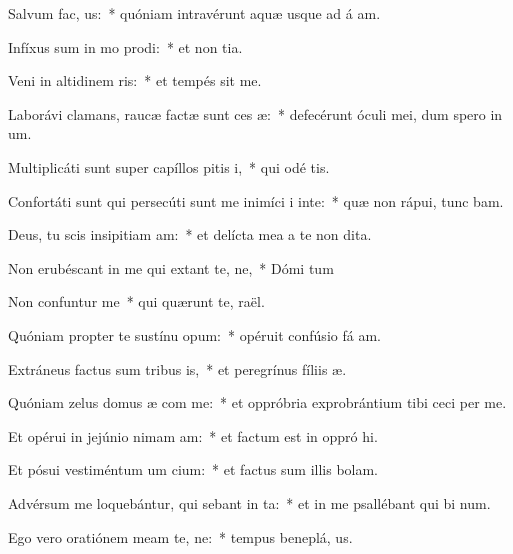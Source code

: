 \item Salvum  fac, us:~* quóniam intravérunt aquæ usque ad á am.
\item Infíxus sum in mo prodi:~* et non  tia.
\item Veni in altidinem ris:~* et tempés sit me.
\item Laborávi clamans, raucæ factæ sunt ces æ:~* defecérunt óculi mei, dum spero in  um.
\item Multiplicáti sunt super capíllos pitis i,~* qui odé  tis.
\item Confortáti sunt qui persecúti sunt me inimíci i inte:~* quæ non rápui, tunc bam.
\item Deus, tu scis insipitiam am:~* et delícta mea a te non  dita.
\item Non erubéscant in me qui extant te, ne,~* Dómi tum
\item Non confuntur  me~* qui quærunt te,  raël.
\item Quóniam propter te sustínu opum:~* opéruit confúsio fá am.
\item Extráneus factus sum tribus is,~* et peregrínus fíliis  æ.
\item Quóniam zelus domus æ com me:~* et oppróbria exprobrántium tibi ceci per me.
\item Et opérui in jejúnio nimam am:~* et factum est in oppró hi.
\item Et pósui vestiméntum um cium:~* et factus sum illis  bolam.
\item Advérsum me loquebántur, qui sebant in ta:~* et in me psallébant qui bi num.
\item Ego vero oratiónem meam  te, ne:~* tempus beneplá, us.
